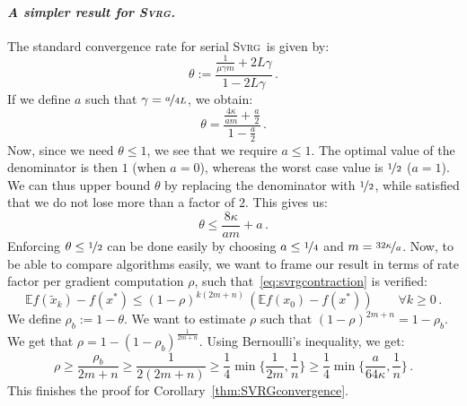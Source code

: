 \documentclass[twoside, 11pt]{article}
\newcommand{\stepsize}{\gamma}
\newcommand{\strongconvex}{\mu}
\newcommand{\contraction}{\rho}
\newcommand{\lipschitz}{L}
\newcommand{\E}{\mathbb{E}}
\newcommand{\SVRG}{\textsc{Svrg}}
\begin{document}
\paragraph{\textit{A simpler result for \SVRG.}}
The standard convergence rate for serial \SVRG\ is given by:
\begin{equation}
\theta := \frac{\frac{1}{\strongconvex\stepsize m} + 2 \lipschitz \stepsize}{1 - 2 \lipschitz \stepsize}\,.
\end{equation}
If we define $a$ such that $\stepsize = \nicefrac{a}{4 \lipschitz}$, we obtain:
\begin{equation}
\theta = \frac{\frac{4 \kappa}{a m} + \frac{a}{2}}{1 - \frac{a}{2}} \,.
\end{equation}
Now, since we need $\theta \leq 1$, we see that we require $a \leq 1$.
The optimal value of the denominator is then $1$ (when $a = 0$), whereas the worst case value is $\nicefrac{1}{2}$ ($a = 1$).
We can thus upper bound $\theta$ by replacing the denominator with $\nicefrac{1}{2}$, while satisfied that we do not lose more than a factor of $2$.
This gives us:
\begin{equation}
\theta \leq \frac{8 \kappa}{a m} + a \,.
\end{equation}
Enforcing $\theta \leq \nicefrac{1}{2}$ can be done easily by choosing $a \leq \nicefrac{1}{4}$ and $m = \nicefrac{32 \kappa}{a}$.
Now, to be able to compare algorithms easily, we want to frame our result in terms of rate factor per gradient computation $\contraction$, such that~\eqref{eq:svrgcontraction} is verified:
\begin{equation*}
\E f(\tilde x_k)-f(x^*) \leq (1-\rho)^{k(2m + n)} \,  (\E f(x_0) -f(x^*)) \qquad \forall k \geq 0 \,.
\end{equation*}
We define $\contraction_b := 1 - \theta$.
We want to estimate $\contraction$ such that $(1-\rho)^{2m + n} = 1 - \contraction_b$.
We get that $\contraction = 1 - (1 - \contraction_b)^{\frac{1}{2m + n}}$.
Using Bernoulli's inequality, we get:
\begin{equation}
\contraction \geq \frac{\contraction_b}{2m + n} \geq \frac{1}{2(2m + n)} \geq \frac{1}{4} \min\big\{\frac{1}{2m}, \frac{1}{n}\big\} \geq \frac{1}{4} \min\big\{\frac{a}{64\kappa}, \frac{1}{n}\big\} \, .
\end{equation}
This finishes the proof for Corollary~\ref{thm:SVRGconvergence}.
\hfill \BlackBox
\end{document}

